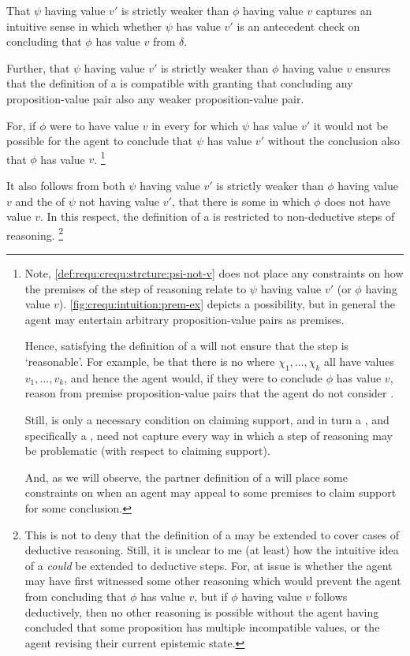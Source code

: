 \begin{note}[Weaker]
  That \(\psi\) having value \(v'\) is strictly weaker than \(\phi\) having value \(v\) captures an intuitive sense in which whether \(\psi\) has value \(v'\) is an antecedent check on concluding that \(\phi\) has value \(v\) from \(\delta\).

  Further, that \(\psi\) having value \(v'\) is strictly weaker than \(\phi\) having value \(v\) ensures that the definition of a \crequ{} is compatible with granting that concluding any proposition-value pair also \indicateV{} any weaker proposition-value pair.

  For, if \(\phi\) were to have value \(v\) in every \epVW{} for which \(\psi\) has value \(v'\) it would not be possible for the agent to conclude that \(\psi\) has value \(v'\) without the conclusion also \indicateV{} that \(\phi\) has value \(v\).\nolinebreak
  \footnote{
    Note, \ref{def:requ:crequ:strcture:psi-not-v} does not place any constraints on how the premises of the step of reasoning relate to \(\psi\) having value \(v'\) (or \(\phi\) having value \(v\)).
    \autoref{fig:crequ:intuition:prem-ex} depicts a possibility, but in general the agent may entertain arbitrary proposition-value pairs as premises.

    Hence, satisfying the definition of a \crequ{} will not ensure that the step is `reasonable'.
    For example, be that there is no \epVW{} where \(\chi_{1},\dots,\chi_{k}\) all have values \(v_{1},\dots,v_{k}\), and hence the agent would, if they were to conclude \(\phi\) has value \(v\), reason from premise proposition-value pairs that the agent do not consider \epVAd{}.

    Still, \ideaCS{} is only a necessary condition on claiming support, and in turn a \requ{}, and specifically a \crequ{}, need not capture every way in which a step of reasoning may be problematic (with respect to claiming support).

    And, as we will observe, the partner definition of a \prequ{} will place some constraints on when an agent may appeal to some premises to claim support for some conclusion.
  }

  It also follows from both \(\psi\) having value \(v'\) is strictly weaker than \(\phi\) having value \(v\) and the \epVN{} of \(\psi\) not having value \(v'\), that there is some \epVW{} in which \(\phi\) does not have value \(v\).
  In this respect, the definition of a \crequ{} is restricted to non-deductive steps of reasoning.\nolinebreak
  \footnote{
    This is not to deny that the definition of a \requ{} may be extended to cover cases of deductive reasoning.
    Still, it is unclear to me (at least) how the intuitive idea of a \crequ{} \emph{could} be extended to deductive steps.
    For, at issue is whether the agent may have first witnessed some other reasoning which would prevent the agent from concluding that \(\phi\) has value \(v\), but if \(\phi\) having value \(v\) follows deductively, then no other reasoning is possible without the agent having concluded that some proposition has multiple incompatible values, or the agent revising their current epistemic state.

}
\end{note}
